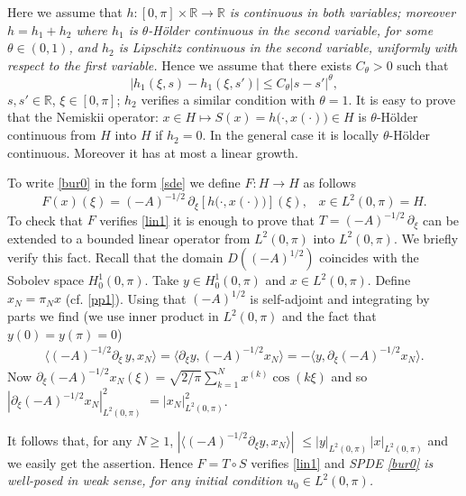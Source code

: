 \documentclass[preprint]{imsart}
\def\R{\mathbb R}
\begin{document}
  Here we   assume that {\sl  $h: [0, \pi] \times \R \to \R$ is continuous in both variables; 
  moreover 
   $h = h_1 + h_2$  where  $h_1$ is $\theta$-H\"older continuous in the second variable, for some $\theta \in (0,1)$,  and $h_2$ is Lipschitz continuous in the second variable, uniformly with respect to the first variable.} Hence  we assume that 
   there exists $C_{\theta}>0$ such that   
 $$
 |   h_1( \xi, s) - h_1(\xi, s')| \le C_{\theta} |s- s'|^{\theta},
 $$
 $s , s' \in \R$, $\xi \in [0, \pi]$; $h_2$ verifies a similar condition with $\theta =1$. 
 It is easy to prove that  
 the  Nemiskii operator: 
   $x \in H \mapsto {S (x)=  h( }  \cdot, x(\cdot)) \in H$ is  $\theta$-H\"older continuous from $H$ into $H$  if $h_2=0$. In the general case it is locally $\theta$-H\"older continuous. Moreover  it has at most a linear growth. 
   

  To write \eqref{bur0} in the form \eqref{sde} we define $F: H \to H$ as follows
$$ 
F(x)(\xi) = (-A)^{-1/2}\,  \partial_{\xi}  [{   h( }\cdot , x(\cdot))](\xi),\;\;\; x \in  L^2(0,\pi)= H. 
$$
To check that  $F$ verifies \eqref{lin1} it is enough to prove  that 
$T= (-A)^{-1/2} \, \partial_{\xi}$ can be extended to a bounded linear {   operator} from $L^2(0,\pi)$ into $L^2(0,\pi)$. 
We briefly verify this fact.
 Recall that the domain $D((-A)^{1/2})$ coincides with the Sobolev space $ H^1_0(0, \pi)$.
Take $y \in H^1_0(0, \pi)$ and $x \in L^2(0, \pi)$. Define $x_N = \pi_N x$ (cf. \eqref{pp1}). 
 Using that $(-A)^{1/2}$ is self-adjoint and integrating by parts we find (we use inner product in $ L^2(0, \pi)$ and the fact  that $y(0) = y(\pi)=0$)
\begin{gather*} 
 \langle (-A)^{-1/2}  \partial_{\xi} \, y , x_N \rangle = \langle   \partial_{\xi} y , (-A)^{-1/2} x_N \rangle =  - \langle    y , \partial_{\xi} (-A)^{-1/2} x_N \rangle.
\end{gather*}   
 Now   $ \partial_{\xi} (-A)^{-1/2} x_N (\xi)    =  \sqrt{2/\pi} \sum_{k=1}^N  x^{(k)} \cos (k \xi)$ and so  $| \partial_{\xi} (-A)^{-1/2} x_N  |_{L^2(0,\pi)}^2$ $=  |x_N  |_{L^2(0,\pi)}^2$. 
  
  
 It follows that, for any $N \ge 1$,
$| \langle (-A)^{-1/2}  \partial_{\xi} y , x_N \rangle | $ $\le |y|_{L^2(0,\pi)} \, 
 |x |_{L^2(0,\pi)}$
 and we easily get the assertion. 
 Hence $F = T \circ S$ verifies \eqref{lin1} and {\sl  SPDE \eqref{bur0} is  well-posed in weak sense, for any initial condition $u_0 \in L^2(0,\pi)$.}
   
\end{document}
